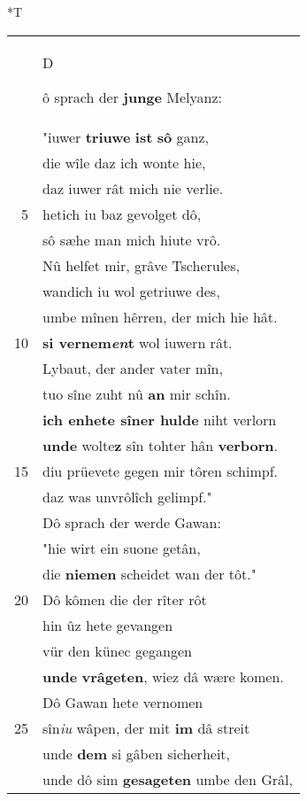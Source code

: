 \documentclass[8pt,a4paper,notitlepage]{article}
\begin{document}
\begin{table}[ht]
\hspace{0.5cm}
\begin{minipage}[t]{0.5\linewidth}
\small
\begin{center}*T
\end{center}
\begin{tabular}{rl}
 & \begin{large}D\end{large}ô sprach der \textbf{junge} Melyanz:\\ 
 & "iuwer \textbf{triuwe} \textbf{ist} \textbf{sô} ganz,\\ 
 & die wîle daz ich wonte hie,\\ 
 & daz iuwer rât mich nie verlie.\\ 
5 & hetich iu baz gevolget dô,\\ 
 & sô sæhe man mich hiute vrô.\\ 
 & Nû helfet mir, grâve Tscherules,\\ 
 & wandich iu wol getriuwe des,\\ 
 & umbe mînen hêrren, der mich hie hât.\\ 
10 & \textbf{si vernem\textit{en}t} wol iuwern rât.\\ 
 & Lybaut, der ander vater mîn,\\ 
 & tuo sîne zuht nû \textbf{an} mir schîn.\\ 
 & \textbf{ich enhete sîner hulde} niht verlorn\\ 
 & \textbf{unde} wolte\textbf{z} sîn tohter hân \textbf{verborn}.\\ 
15 & diu prüevete gegen mir tôren schimpf.\\ 
 & daz was unvrôlîch gelimpf."\\ 
 & Dô sprach der werde Gawan:\\ 
 & "hie wirt ein suone getân,\\ 
 & die \textbf{niemen} scheidet wan der tôt."\\ 
20 & Dô kômen die der rîter rôt\\ 
 & hin ûz hete gevangen\\ 
 & vür den künec gegangen\\ 
 & \textbf{unde} \textbf{vrâgeten}, wiez dâ wære komen.\\ 
 & Dô Gawan hete vernomen\\ 
25 & sîn\textit{iu} wâpen, der mit \textbf{im} dâ streit\\ 
 & unde \textbf{dem} si gâben sicherheit,\\ 
 & unde dô sim \textbf{gesageten} umbe den Grâl,\\ 

\end{tabular}
\end{minipage}
\end{table}
\end{document}
